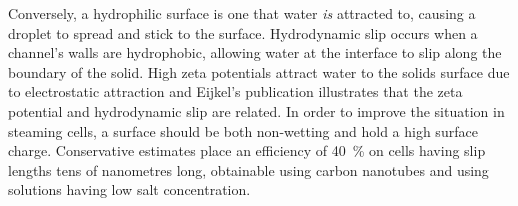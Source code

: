     Conversely, a hydrophilic surface is one that water \emph{is} attracted to, causing a droplet to spread and stick to the surface.
    Hydrodynamic slip occurs when a channel's walls are hydrophobic, allowing water at the interface to slip along the boundary of the solid.
    High zeta potentials attract water to the solids surface due to electrostatic attraction and Eijkel's publication illustrates that the zeta potential and hydrodynamic slip are related.
    In order to improve the situation in steaming cells, a surface should be both non-wetting and hold a high surface charge.
    Conservative estimates place an efficiency of \SI{40}{\percent} on cells having slip lengths tens of nanometres long, obtainable using carbon nanotubes and using solutions having low salt concentration.








